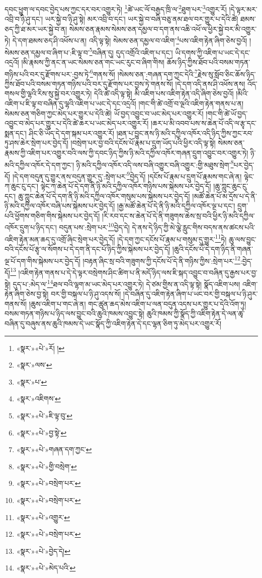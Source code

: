 དབང་ཕྱུག་ལ་དབང་བྱེད་པས་ཀྱང་དར་བར་འགྱུར་ཏེ། \footnote{«སྣར་»«པེ་»རོ། ། }ཚེ་ཡང་ལོ་བརྒྱད་ཁྲི་ལ་\footnote{«སྣར་»ལས་}ཐུག་པར་\footnote{«སྣར་»པ་}འགྱུར་རོ། །དེ་ལྟར་མར་འབྲི་བ་ཉི་ཤུ་དང་། ཡར་སྐྱེ་བ་ཉི་ཤུ་སྟེ། མར་འབྲི་བ་དང་། ཡར་སྐྱེ་བ་བཞི་བཅུ་ནམ་ཐལ་བར་གྱུར་པ་དེའི་ཚེ། ཐམས་ཅད་ཀྱི་ཐ་མར་ཡར་སྐྱེ་བ་ན། སེམས་ཅན་རྣམས་སེམས་ཅན་དམྱལ་བ་དག་ནས་འཆི་འཕོ་ལ་ཕྱིར་སྐྱེ་བར་མི་འགྱུར་ཏེ། དེ་དག་ཐམས་ཅད་ཤི་འཕོས་པ་ན། འདི་ལྟ་སྟེ། སེམས་ཅན་དམྱལ་བ་འཇིག་\footnote{«སྣར་»འཇིགས་}པས་འཇིག་རྟེན་ཞིག་ཅེས་བྱའོ། །སེམས་ཅན་དམྱལ་བ་ཞིག་པ་:ཇི་ལྟ་བ་\footnote{«སྣར་»«པེ་»ཇི་ལྟ་བུ་}བཞིན་དུ། དུད་འགྲོའི་འཇིག་པ་དང་། ཡི་དགས་ཀྱི་འཇིག་པ་ཡང་དེ་དང་འདྲའོ། །མི་རྣམས་ཀྱི་ནང་ན་ཡང་སེམས་ཅན་གང་ཡང་རུང་བ་ཞིག་གིས། ཆོས་ཉིད་ཀྱིས་ཐོབ་པའི་བསམ་གཏན་གཉིས་པའི་བར་དུ་རྫོགས་པར་:བྱས་ཏེ་\footnote{«སྣར་»«པེ་»བྱ་སྟེ་}གནས་སོ། །སེམས་ཅན་:གཞན་དག་ཀྱང་དེའི་\footnote{«སྣར་»«པེ་»གཞན་དག་ཀྱང་}རྗེས་སུ་སློབ་ཅིང་ཆོས་ཉིད་ཀྱིས་ཐོབ་པའི་བསམ་གཏན་གཉིས་པའི་བར་དུ་རྫོགས་པར་བྱས་ཏེ་གནས་སོ། །དེ་དག་འདི་ནས་ཤི་འཕོས་ནས། འོད་གསལ་གྱི་ལྷའི་རིས་སུ་སྐྱེ་བར་འགྱུར་ཏེ། དེའི་ཚེ་འདི་ལྟ་སྟེ། མི་འཇིག་པས་འཇིག་རྟེན་འདི་ཞིག་ཅེས་བྱའོ། །མིའི་འཇིག་པ་ཇི་ལྟ་བ་བཞིན་དུ་ལྷའི་འཇིག་པ་ཡང་དེ་དང་འདྲའོ། །གང་གི་ཚེ་འགྲོ་བ་ལྔའི་འཇིག་རྟེན་གནས་པ་ན། སེམས་ཅན་གཅིག་ཀྱང་མེད་པར་གྱུར་པ་དེའི་ཚེ། ཡོ་བྱད་འབྱུང་བ་ཡང་མེད་པར་འགྱུར་རོ། །གང་གི་ཚེ་ཡོ་བྱད་འབྱུང་བ་མེད་པར་གྱུར་པ་དེའི་ཚེ་ཆར་པ་ཡང་མེད་པར་འགྱུར་རོ། །ཆར་པ་མི་འབབ་པས་ས་ཆེན་པོ་འདི་ལ་རྩྭ་དང་སྨན་དང་། ཤིང་ཅི་ཡོད་དེ་དག་སྐམ་པར་འགྱུར་རོ། །ཐན་པ་བྱུང་ནས་ཉི་མའི་དཀྱིལ་འཁོར་འདི་ཉིད་ཀྱིས་ཀྱང་རབ་ཏུ་ཤས་ཆེར་སྲེག་པར་བྱེད་དོ། །བསྲེག་པར་བྱ་བའི་དངོས་པོ་རྣམ་པ་དྲུག་ཡོད་པའི་ཕྱིར་འདི་ལྟ་སྟེ། སེམས་ཅན་རྣམས་ཀྱི་འཇིག་པར་འགྱུར་བའི་ལས་ཀྱི་དབང་ཉིད་ཀྱིས་ཉི་མའི་དཀྱིལ་འཁོར་གཞན་དྲུག་འབྱུང་བར་འགྱུར་ཏེ། ཉི་མའི་དཀྱིལ་འཁོར་དེ་དག་ཀྱང་། ཉི་མའི་དཀྱིལ་འཁོར་འདི་ལས་བཞི་འགྱུར་བཞི་འགྱུར་:གྱི་མཐུས་སྲེག་\footnote{«སྣར་»«པེ་»གྱི་བསྲེག་}པར་བྱེད་དོ། །དེ་དག་བདུན་དུ་གྱུར་ནས་བདུན་གྱུར་དུ་:སྲེག་པར་\footnote{«སྣར་»«པེ་»བསྲེག་པར་}བྱེད་དོ། །དངོས་པོ་རྣམ་པ་དྲུག་པོ་རྣམས་གང་ཞེ་ན། ལྟེང་ཀ་ཆུང་ངུ་དང་། ལྟེང་ཀ་ཆེན་པོ་དེ་དག་ནི་ཉི་མའི་དཀྱིལ་འཁོར་གཉིས་པས་སྐེམས་པར་བྱེད་དོ། །ཆུ་ཀླུང་ཆུང་ངུ་དང་། ཆུ་ཀླུང་ཆེན་པོ་དེ་དག་ནི་ཉི་མའི་དཀྱིལ་འཁོར་གསུམ་པས་སྐེམས་པར་བྱེད་དོ། །མཚོ་ཆེན་པོ་མ་དྲོས་པ་དེ་ནི་ཉི་མའི་དཀྱིལ་འཁོར་བཞི་པས་སྐེམས་པར་བྱེད་དོ། །རྒྱ་མཚོ་ཆེན་པོ་དེ་ནི་ཉི་མའི་དཀྱིལ་འཁོར་ལྔ་པ་དང་། དྲུག་པའི་ཕྱོགས་གཅིག་གིས་སྐེམས་པར་བྱེད་དོ། །རི་རབ་དང་ས་ཆེན་པོ་དེ་ནི་གཟུགས་ཆེས་སྲ་བའི་ཕྱིར་ཉི་མའི་དཀྱིལ་འཁོར་དྲུག་པ་ཉིད་དང་། བདུན་པས་:སྲེག་པར་\footnote{«སྣར་»«པེ་»བསྲེག་པར་}བྱེད་དེ། དེ་ནས་དེ་ཉིད་ཀྱི་མེ་ལྕེ་རླུང་གིས་བདས་ནས་ཚངས་པའི་འཇིག་རྟེན་མན་ཆད་དུ་འགྲོ་ཞིང་སྲེག་པར་བྱེད་དོ། །དེ་དག་ཀྱང་དངོས་པོ་རྣམ་པ་གསུམ་དུ་གྱུར་\footnote{«སྣར་»«པེ་»འགྱུར་}ཏེ། ཆུ་ལས་བྱུང་བའི་དངོས་པོ་རྩྭ་ལ་སོགས་པ་དེ་དག་ནི་དང་པོ་ཉིད་ཀྱིས་སྐེམས་པར་བྱེད་དོ། །ཆུའི་དངོས་པོ་དེ་དག་ཉིད་ནི་གཞན་ལྔ་པོ་དག་གིས་སྐེམས་པར་བྱེད་དོ། །བརྟན་ཞིང་སྲ་བའི་གཟུགས་ཀྱི་དངོས་པོ་དེ་ནི་གཉིས་ཀྱིས་:སྲེག་པར་\footnote{«སྣར་»«པེ་»བསྲེག་པར་}:བྱེད་དོ།\footnote{«སྣར་»«པེ་»བྱེད་དེ།} །འཇིག་རྟེན་གནས་པ་དེ་དེ་ལྟར་བསྲེགས་ཤིང་ཚིག་པ་ནི་མདོ་ཉིད་ལས་ཇི་སྐད་འབྱུང་བ་བཞིན་དུ་རྒྱས་པར་བྱ་སྟེ། དུད་པ་:མེད་ལ་\footnote{«སྣར་»«པེ་»མེད་པའི་}ཐལ་བའི་ལྷག་མ་ཡང་མེད་པར་འགྱུར་ཏེ། དེ་ཙམ་གྱིས་ན་འདི་ལྟ་སྟེ། སྣོད་འཇིག་པས། འཇིག་རྟེན་ཞིག་ཅེས་བྱ་སྟེ། བར་གྱི་བསྐལ་པ་ཉི་ཤུ་འདས་སོ། །དེ་བཞིན་དུ་འཇིག་རྟེན་ཞིག་པ་ཡང་བར་གྱི་བསྐལ་པ་ཉི་ཤུར་གནས་སོ། །ཆུས་འཇིག་པ་གང་ཞེ་ན། གང་ཚུན་ཆད་མེས་འཇིག་པ་ལན་བདུན་འདས་པར་གྱུར་པ་དེའི་འོག་ཏུ། བསམ་གཏན་གཉིས་པ་ཉིད་ལས་བྱུང་བའི་ཆུའི་ཁམས་འབྱུང་སྟེ། ཆུའི་ཁམས་ཀྱི་སྣོད་ཀྱི་འཇིག་རྟེན་དེ་ལན་ཚྭ་བཞིན་དུ་བཞུས་ནས་ཆུའི་ཁམས་དེ་ཡང་སྣོད་ཀྱི་འཇིག་རྟེན་དེ་དང་ལྷན་ཅིག་ཏུ་མེད་པར་འགྱུར་རོ། 